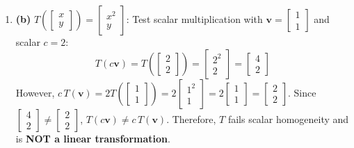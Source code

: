 \begin{enumerate}
    \item \textbf{(b)} $T\left(\begin{bmatrix} x \\ y \end{bmatrix}\right) = \begin{bmatrix} x^2 \\ y \end{bmatrix}$:
    Test scalar multiplication with $\mathbf{v} = \begin{bmatrix} 1 \\ 1 \end{bmatrix}$ and scalar $c = 2$:
    \begin{equation*}
    T(c\mathbf{v}) = T\left(\begin{bmatrix} 2 \\ 2 \end{bmatrix}\right) = \begin{bmatrix} 2^2 \\ 2 \end{bmatrix} = \begin{bmatrix} 4 \\ 2 \end{bmatrix}
    \end{equation*}
    However, $c\, T(\mathbf{v}) = 2 T\left(\begin{bmatrix} 1 \\ 1 \end{bmatrix}\right) = 2 \begin{bmatrix} 1^2 \\ 1 \end{bmatrix} = 2 \begin{bmatrix} 1 \\ 1 \end{bmatrix} = \begin{bmatrix} 2 \\ 2 \end{bmatrix}$.
    Since $\begin{bmatrix} 4 \\ 2 \end{bmatrix} \neq \begin{bmatrix} 2 \\ 2 \end{bmatrix}$, $T(c\mathbf{v}) \neq c\, T(\mathbf{v})$.
    Therefore, $T$ fails scalar homogeneity and is \textbf{NOT a linear transformation}.


\end{enumerate}
